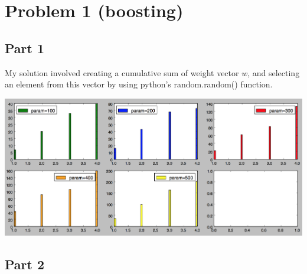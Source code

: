 \documentclass[11pt]{article}
\begin{document}

\section*{Problem 1 (boosting)}

\subsection*{Part 1}

My solution involved creating a cumulative sum of weight vector $w$, and selecting an element from this vector by using python's random.random() function.

\includegraphics[scale=.5]{images/bootstrap.png}

\subsection*{Part 2}
\end{document}

